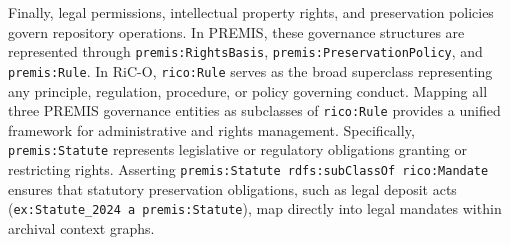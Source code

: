 \documentclass[runningheads]{llncs}
\begin{document}
Finally, legal permissions, intellectual property rights, and preservation policies govern repository operations. In PREMIS, these governance structures are represented through \texttt{premis:RightsBasis}, \texttt{premis:PreservationPolicy}, and \texttt{premis:Rule}. In RiC-O, \texttt{rico:Rule} serves as the broad superclass representing any principle, regulation, procedure, or policy governing conduct. Mapping all three PREMIS governance entities as subclasses of \texttt{rico:Rule} provides a unified framework for administrative and rights management. Specifically, \texttt{premis:Statute} represents legislative or regulatory obligations granting or restricting rights. Asserting \texttt{premis:Statute rdfs:subClassOf rico:Mandate} ensures that statutory preservation obligations, such as legal deposit acts (\texttt{ex:Statute\_2024 a premis:Statute}), map directly into legal mandates within archival context graphs.
	
	
	
\end{document}
